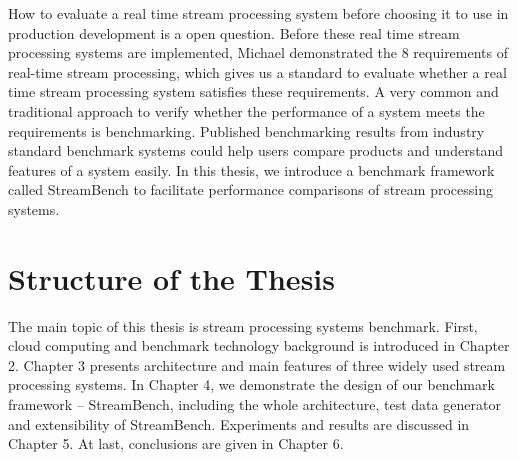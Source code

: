 How to evaluate a real time stream processing system before choosing it to use in production development is a open question.  Before these real time stream processing systems are implemented, Michael demonstrated the 8 requirements\cite{8requirements} of real-time stream processing, which gives us a standard to evaluate whether a real time stream processing system satisfies these requirements.  A very common and traditional approach to verify whether the performance of a system meets the requirements is benchmarking. Published benchmarking results from industry standard benchmark systems could help users compare products and understand features of a system easily. In this thesis, we introduce a benchmark framework called StreamBench to facilitate performance comparisons of stream processing systems. 

\section{Structure of the Thesis}
\label{section:structure} 
The main topic of this thesis is stream processing systems benchmark. First, cloud computing and benchmark technology background is introduced in Chapter 2. Chapter 3 presents architecture and main features of three widely used stream processing systems. In Chapter 4, we demonstrate the design of our benchmark framework -- StreamBench, including the whole architecture, test data generator and extensibility of StreamBench. Experiments and results are discussed in Chapter 5. At last, conclusions are given in Chapter 6.

\clearpage